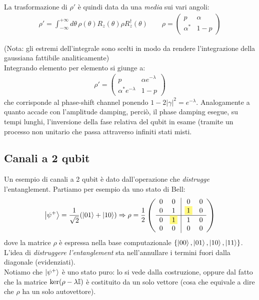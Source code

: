 \documentclass[../../InformazioneQuantistica.tex]{subfiles}
\begin{document}
La trasformazione di $\rho'$ è quindi data da una \textit{media} sui vari angoli:
\begin{align*}
\rho' = \int_{-\infty}^{+\infty} d\theta \, \rho(\theta) R_z(\theta) \rho R_z^\dag(\theta) \qquad \rho=\begin{pmatrix}
p & \alpha\\
\alpha^* & 1-p
\end{pmatrix}
\end{align*}

(Nota: gli estremi dell'integrale sono scelti in modo da rendere l'integrazione della gaussiana fattibile analiticamente)\\

Integrando elemento per elemento si giunge a:
\begin{align*}
\rho'= \begin{pmatrix} p & \alpha e^{-\lambda}\\
\alpha^*e^{-\lambda} & 1-p \end{pmatrix}
\end{align*}
che corrisponde al phase-shift channel ponendo $1-2|\gamma|^2 = e^{-\lambda}$. Analogamente a quanto accade con l'amplitude damping, perciò, il phase damping esegue, su tempi lunghi, l'inversione della fase relativa del qubit in esame (tramite un processo non unitario che passa attraverso infiniti stati misti.


\subsection{Canali a 2 qubit}
Un esempio di canali a 2 qubit è dato dall'operazione che \textit{distrugge} l'entanglement. Partiamo per esempio da uno stato di Bell:
\begin{align*}
\ket{\psi^+} = \frac{1}{\sqrt{2}}(\ket{01}+\ket{10}) \Rightarrow \rho=\frac{1}{2}\left(
\begin{array}{cc|cc}
0 & 0 & 0 & 0\\
0 & 1 & \hlc{Yellow}{1} & 0\\ \hline
0 & \hlc{Yellow}{1} & 1 & 0\\
0 & 0 & 0 & 0
\end{array}
\right)
\end{align*}
dove la matrice $\rho$ è espressa nella base computazionale $\{\Ket{00}, \Ket{01}, \Ket{10}, \Ket{11}\}$.\\
L'idea di \textit{distruggere l'entanglement} sta nell'annullare i termini fuori dalla diagonale (evidenziati).\\
Notiamo che $\Ket{\psi^+}$ è uno stato puro: lo si vede dalla costruzione, oppure dal fatto che la matrice $\operatorname{ker}(\rho-\lambda \mathbb{I})$ è costituito da un solo vettore (cosa che equivale a dire che $\rho$ ha un solo autovettore).\\
\end{document}
